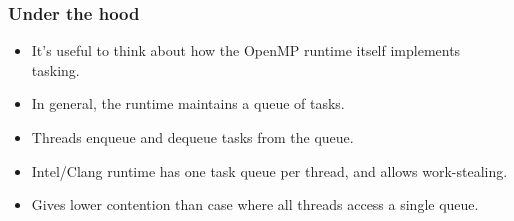 \documentclass{beamer}
\begin{document}
\begin{frame}
\frametitle{Under the hood}
\begin{itemize}
  \item It's useful to think about how the OpenMP runtime itself implements tasking.
  \item In general, the runtime maintains a queue of tasks.
  \item Threads enqueue and dequeue tasks from the queue.
\end{itemize}

\begin{center}
\begin{adjustbox}{max width={\textwidth}}
\end{adjustbox}
\end{center}

\begin{itemize}
  \item Intel/Clang runtime has one task queue per thread, and allows work-stealing.
  \item Gives lower contention than case where all threads access a single queue.
\end{itemize}

\end{frame}

\end{document}

